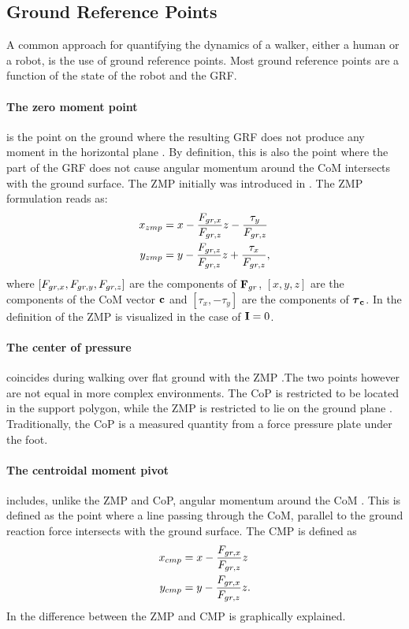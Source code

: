 \subsection{Ground Reference Points}\label{sec:grp}
A common approach for quantifying the dynamics of a walker, either a human or a robot, is the use of ground reference points. Most ground reference points are a function of the state of the robot and the \ac{GRF}.

\paragraph{The zero moment point} is the point on the ground where the resulting \ac{GRF} does not produce any moment in the horizontal plane \cite{sardain2004forces}. By definition, this is also the point where the part of the \ac{GRF} does not cause angular momentum around the \ac{CoM} intersects with the ground surface. The \ac{ZMP} initially was introduced in \cite{vukobratovic1969contribution}. The \ac{ZMP} formulation reads as:
\begin{align}
    x_{zmp}&=x-\frac{F_{gr,x}}{F_{gr,z}}z-\frac{\tau_y}{F_{gr,z}}\\
    y_{zmp}&=y-\frac{F_{gr,z}}{F_{gr,z}}z+\frac{\tau_x}{F_{gr,z}},
\end{align}
where $[F_{gr,x},F_{gr,y},F_{gr,z}]$ are the components of $\mathbf{F}_{gr}$, $[x,y,z]$ are the components of the \ac{CoM} vector $\mathbf{c}$ and $[\tau_x,-\tau_y]$ are the components of $\boldsymbol{\tau}_{\mathbf{c}}$. In  the definition of the \ac{ZMP} is visualized in the case of $\mathbf{I}=0$. 

\paragraph{The center of pressure} coincides during walking over flat ground with the \ac{ZMP} \cite{vukobratovic2004zero}.The two points however are not equal in more complex environments. The \ac{CoP} is restricted to be located in the support polygon, while the \ac{ZMP} is restricted to lie on the ground plane  \cite{sardain2004forces}. Traditionally, the \ac{CoP} is a measured quantity from a force pressure plate under the foot.

\paragraph{The centroidal moment pivot} includes, unlike the \ac{ZMP} and \ac{CoP}, angular momentum around the \ac{CoM}  \cite{popovic2005ground}. This is defined as the point where a line passing through the \ac{CoM}, parallel to the ground reaction force intersects with the ground surface. The \ac{CMP} is defined as
\begin{align}
    x_{cmp}&=x-\frac{F_{gr,x}}{F_{gr,z}}z\\
    y_{cmp}&=y-\frac{F_{gr,x}}{F_{gr,z}}z.
\end{align}
In  the difference between the \ac{ZMP} and \ac{CMP} is graphically explained. 

